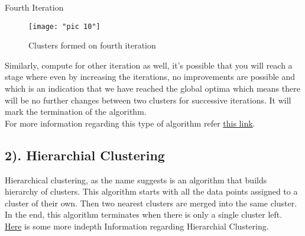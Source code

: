 \documentclass[Proceedings]{ascelike}
\begin{document}
{Fourth Iteration
\begin{figure}[!ht]
	\centering
	\texttt{[image: "pic 10"]}
	\caption{Clusters formed on fourth iteration }
	\label{fig:pic-9}
\end{figure}

Similarly, compute for other iteration as well, it's possible that you will reach a stage where even by increasing the iterations, no improvements are possible and which is an indication that we have reached the global optima which means there will be no further changes between two clusters for successive iterations. It will mark the termination of the algorithm.\\

For more information regarding this type of algorithm refer \href{https://home.deib.polimi.it/matteucc/Clustering/tutorial_html/kmeans.html}{this link}.

\subsection{2). Hierarchial Clustering}
Hierarchical clustering, as the name suggests is an algorithm that builds hierarchy of clusters. This algorithm starts with all the data points assigned to a cluster of their own. Then two nearest clusters are merged into the same cluster. In the end, this algorithm terminates when there is only a single cluster left.\\

\href{https://home.deib.polimi.it/matteucc/Clustering/tutorial_html/hierarchical.html}{Here} is some more indepth Information regarding Hierarchial Clustering. 

}
\end{document}
